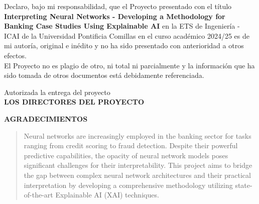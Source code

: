 \documentclass[12pt]{extarticle}
\numberwithin{equation}{section}
\begin{document}
\newpage

{\fontsize{14}{18}\selectfont
    Declaro, bajo mi responsabilidad, que el Proyecto presentado con el título \textbf{Interpreting Neural Networks - Developing a Methodology for Banking Case Studies Using Explainable AI} en la ETS de Ingeniería - ICAI de la Universidad Pontificia Comillas en el curso académico 2024/25 es de mi autoría, original e inédito y no ha sido presentado con anterioridad a otros efectos. \\
    
    El Proyecto no es plagio de otro, ni total ni parcialmente y la información que ha sido tomada de otros documentos está debidamente referenciada.
    
    \vspace{2cm}  %
    

    
    \vspace{2cm}  %
    
    \begin{center}
        Autorizada la entrega del proyecto \\
        \vspace{1cm}
        \textbf{LOS DIRECTORES DEL PROYECTO}
    \end{center}
    
    \vspace{1cm}  %
    
}

\newpage

{\fontsize{17}{20}\selectfont
    \begin{center}
        \textbf{AGRADECIMIENTOS}
    \end{center}
}

\newpage
\begin{abstract}
    Neural networks are increasingly employed in the banking sector for tasks ranging from credit scoring to fraud detection. Despite their powerful predictive capabilities, the opacity of neural network models poses significant challenges for their interpretability. This project aims to bridge the gap between complex neural network architectures and their practical interpretation by developing a comprehensive methodology utilizing state-of-the-art Explainable AI (XAI) techniques.
\end{abstract}
\end{document}
